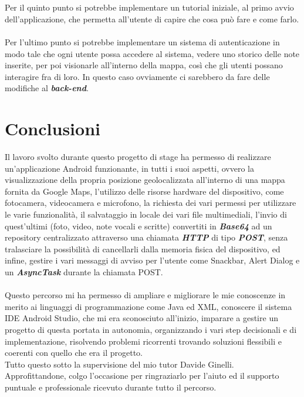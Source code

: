 \\\\Per il quinto punto si potrebbe implementare un tutorial iniziale, al primo avvio dell'applicazione, che permetta all'utente di capire che cosa può fare e come farlo.
\\\\Per l'ultimo punto si potrebbe implementare un sistema di autenticazione in modo tale che ogni utente possa accedere al sistema, vedere uno storico delle note inserite, per poi visionarle all'interno della mappa, così che gli utenti possano interagire fra di loro. In questo caso ovviamente ci sarebbero da fare delle modifiche al \textit{\textbf{back-end}}.

\section{Conclusioni}
Il lavoro svolto durante questo progetto di stage ha permesso di realizzare un'applicazione Android funzionante, in tutti i suoi aspetti, ovvero la visualizzazione della propria posizione geolocalizzata all'interno di una mappa fornita da Google Maps, l'utilizzo delle risorse hardware del dispositivo, come fotocamera, videocamera e microfono, la richiesta dei vari permessi per utilizzare le varie funzionalità, il salvataggio in locale dei vari file multimediali, l'invio di quest'ultimi (foto, video, note vocali e scritte) convertiti in \textit{\textbf{Base64}} ad un repository centralizzato attraverso una chiamata \textit{\textbf{HTTP}} di tipo \textit{\textbf{POST}}, senza tralasciare la possibilità di cancellarli dalla memoria fisica del dispositivo, ed infine, gestire i vari messaggi di avviso per l'utente come Snackbar, Alert Dialog e un \textit{\textbf{AsyncTask}} durante la chiamata POST.
\\\\Questo percorso mi ha permesso di ampliare e migliorare le mie conoscenze in merito ai linguaggi di programmazione come Java ed XML, conoscere il sistema IDE Android Studio, che mi era sconosciuto all'inizio, imparare a gestire un progetto di questa portata in autonomia, organizzando i vari step decisionali e di implementazione, risolvendo problemi ricorrenti trovando soluzioni flessibili e coerenti con quello che era il progetto. 
\\Tutto questo sotto la supervisione del mio tutor Davide Ginelli. 
\\Approfittandone, colgo l'occasione per ringraziarlo per l'aiuto ed il supporto puntuale e professionale ricevuto durante tutto il percorso.